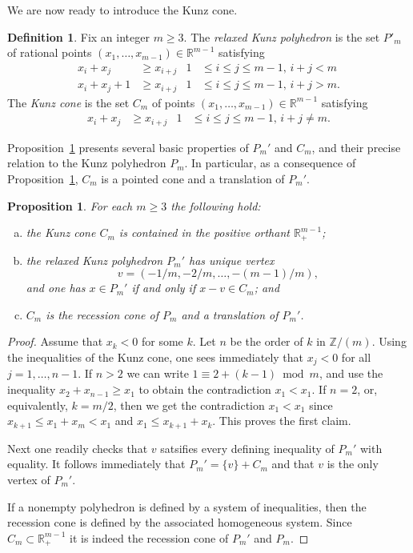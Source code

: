 \documentclass[12pt]{amsart}
\newtheorem{prop}[thm]{Proposition}
\theoremstyle{definition}
\newtheorem{defn}[thm]{Definition}
\numberwithin{equation}{section}
\newcommand{\ring}[1]{\ensuremath{\mathbb{#1}}}
\renewcommand\>{\rangle}
\newcommand\<{\langle}
\newcommand\0{\mathbf{0}}
\newcommand\RR{\ring{R}}
\newcommand\ZZ{\ring{Z}}
\begin{document}
We are now ready to introduce the Kunz cone.  

\begin{defn}\label{d:kunzcone}
Fix an integer $m\ge 3$.  The \emph{relaxed Kunz polyhedron} is the set $P'_m$ of rational points $(x_1,\ldots,x_{m-1})\in\mathbb{R}^{m-1}$ satisfying
\begin{align*}
x_i + x_j     &\ge x_{i+j}   & 1 &\le i \le j \le m-1, \, i + j < m
\\
x_i + x_j + 1 &\ge x_{i+j} & 1 &\le i \le j \le m-1, \, i + j > m.
\end{align*}
The \emph{Kunz cone} is the set $C_m$ of points $(x_1,\ldots,x_{m-1})\in\mathbb{R}^{m-1}$ satisfying
\begin{align*}
x_i + x_j &\ge x_{i+j}   & 1 &\le i \le j \le m-1, \, i + j \ne m.
\end{align*}
\end{defn}

Proposition~\ref{p:relaxedvertex} presents several basic properties of $P_m'$ and $C_m$, and their precise relation to the Kunz polyhedron $P_m$.  In particular, as a consequence of Proposition~\ref{p:relaxedvertex}, $C_m$ is a pointed cone and a translation of $P_m'$.  

\begin{prop}\label{p:relaxedvertex}
For each $m\ge 3$ the following hold:
\begin{enumerate}[(a)]
\item 
the Kunz cone $C_m$ is contained in the positive orthant $\RR_+^{m-1}$;

\item 
the relaxed Kunz polyhedron $P_m'$ has unique vertex
\[
v = (-1/m,-2/m,\ldots,-(m-1)/m),
\]
and one has $x \in P_m'$ if and only if $x - v \in C_m$; and 

\item 
$C_m$ is the recession cone of $P_m$ and a translation of $P_m'$.
\end{enumerate}  
\end{prop}

\begin{proof}
Assume that $x_k < 0$ for some $k$.  Let $n$ be the order of $k$ in $\ZZ/(m)$.  Using the inequalities of the Kunz cone, one sees immediately that $x_j < 0$ for all $j = 1, \dots, n-1$.  If $n > 2$ we can write $1 \equiv 2 + (k-1) \bmod m$, and use the inequality $x_2 + x_{n-1}	\ge x_1$ to obtain the contradiction $x_1 < x_1$. If $n = 2$, or, equivalently, $k = m/2$, then we get the contradiction $x_1 < x_1$ since $x_{k+1} \le x_1 + x_m < x_1$ and $x_1 \le x_{k+1} + x_k$. This proves the first claim.

Next one readily checks that $v$ satsifies every defining inequality of $P_m'$ with equality. It follows immediately that $P_m'=\{v\}+C_m$ and that $v$ is the only vertex of $P_m'$.

If a nonempty polyhedron is defined by a system of inequalities, then the recession cone is defined by the associated homogeneous system. Since $C_m\subset \RR_+^{m-1}$ it is indeed the recession cone of $P_m'$ and $P_m$.
\end{proof}
\end{document}
